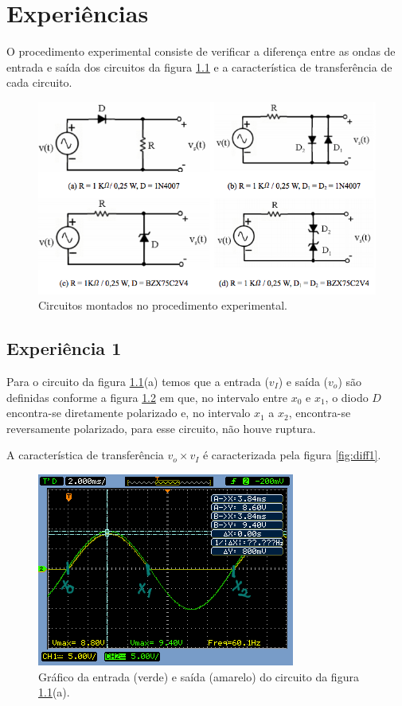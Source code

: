 \documentclass{abntex2}
\begin{document}
\imprimircapa
\imprimirfolhaderosto

\tableofcontents
\listoffigures
\clearpage

\chapter{Experiências}

O procedimento experimental consiste de verificar a diferença entre as ondas de entrada e saída dos circuitos da figura \ref{fig:circuitos} e a característica de transferência de cada circuito.

\begin{figure}[h]
  \centering
  \includegraphics[width=.8\textwidth]{circuitos.png}
  \caption{Circuitos montados no procedimento experimental.}
  \label{fig:circuitos}
\end{figure}

\section{Experiência 1}

Para o circuito da figura \ref{fig:circuitos}(a) temos que a entrada ($v_I$) e saída ($v_o$) são definidas conforme a figura \ref{fig:io1} em que, no intervalo entre $x_0$ e $x_1$, o diodo $D$ encontra-se diretamente polarizado e, no intervalo $x_1$ a $x_2$, encontra-se reversamente polarizado, para esse circuito, não houve ruptura.

A característica de transferência $v_o \times v_I$ é caracterizada pela figura \ref{fig:diff1}.

\begin{figure}[h]
  \centering
  \includegraphics[width=.8\textwidth]{circuito-1a-esboco2.png}
  \caption{Gráfico da entrada (verde) e saída (amarelo) do circuito da figura \ref{fig:circuitos}(a).}
  \label{fig:io1}
\end{figure}
\end{document}
